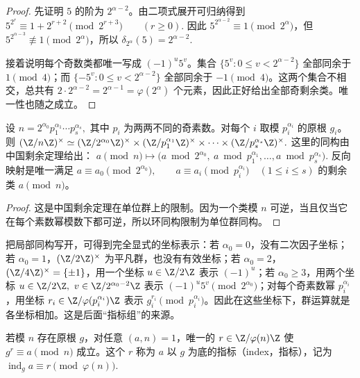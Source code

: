 \begin{proof}
先证明 $5$ 的阶为 $2^{\alpha-2}$。由二项式展开可归纳得到
\(
  5^{2^r}\equiv 1+2^{r+2}\pmod {2^{r+3}}\qquad(r\ge 0).
\)
因此 $5^{2^{\alpha-2}}\equiv 1\pmod {2^\alpha}$，但
$5^{2^{\alpha-3}}\not\equiv 1\pmod {2^\alpha}$，所以
\(
  \delta_{2^\alpha}(5)=2^{\alpha-2}.
\)

接着说明每个奇数类都唯一写成 $(-1)^u5^v$。集合
\(
  \{5^v:0\le v<2^{\alpha-2}\}
\)
全部同余于 $1\pmod 4$；而
\(
  \{-5^v:0\le v<2^{\alpha-2}\}
\)
全部同余于 $-1\pmod 4$。这两个集合不相交，总共有
$2\cdot 2^{\alpha-2}=2^{\alpha-1}=\varphi(2^\alpha)$ 个元素，因此正好给出全部奇剩余类。唯一性也随之成立。
\end{proof}

\begin{theorem}[一般结构定理]
设
\(
  n=2^{\alpha_0}p_1^{\alpha_1}\cdots p_s^{\alpha_s},
\)
其中 $p_i$ 为两两不同的奇素数。对每个 $i$ 取模 $p_i^{\alpha_i}$ 的原根 $g_i$。则
\(
  \U n
  \simeq
  \U{2^{\alpha_0}}
  \times
  \U{p_1^{\alpha_1}}
  \times\cdots\times
  \U{p_s^{\alpha_s}}.
\)
这里的同构由中国剩余定理给出：
\(
  a\pmod n
  \longmapsto
  \bigl(a\bmod 2^{\alpha_0},\ a\bmod p_1^{\alpha_1},\ldots,a\bmod p_s^{\alpha_s}\bigr).
\)
反向映射是唯一满足
\(
  a\equiv a_0\pmod {2^{\alpha_0}},\qquad
  a\equiv a_i\pmod {p_i^{\alpha_i}}\quad(1\le i\le s)
\)
的剩余类 $a\pmod n$。
\end{theorem}

\begin{proof}
这是中国剩余定理在单位群上的限制。因为一个类模 $n$ 可逆，当且仅当它在每个素数幂模数下都可逆，所以环同构限制为单位群同构。
\end{proof}

把局部同构写开，可得到完全显式的坐标表示：若 $\alpha_0=0$，没有二次因子坐标；若 $\alpha_0=1$，$\U2$ 为平凡群，也没有有效坐标；若 $\alpha_0=2$，$\U4=\{\pm1\}$，用一个坐标 $u\in\Cyc2$ 表示 $(-1)^u$；若 $\alpha_0\ge3$，用两个坐标 \(u\in\Cyc2,\ v\in\Cyc{2^{\alpha_0-2}}\) 表示 \((-1)^u5^v\pmod {2^{\alpha_0}}\)；对每个奇素数幂 $p_i^{\alpha_i}$，用坐标 \(r_i\in \Cyc{\varphi(p_i^{\alpha_i})}\) 表示 \(g_i^{r_i}\pmod {p_i^{\alpha_i}}\)。因此在这些坐标下，群运算就是各坐标相加。这是后面“指标组”的来源。

\begin{definition}[指标]
若模 $n$ 存在原根 $g$，对任意 $(a,n)=1$，唯一的
\(
  r\in \Z/\varphi(n)\Z
\)
使
\(
  g^r\equiv a\pmod n
\)
成立。这个 $r$ 称为 $a$ 以 $g$ 为底的指标（index，指标），记为
\(
  \operatorname{ind}_g a\equiv r\pmod{\varphi(n)}.
\)
\end{definition}

